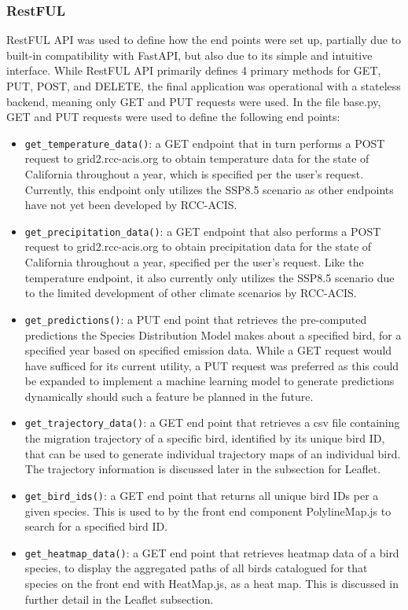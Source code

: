 \documentclass{article}
\begin{document}
\subsubsection*{RestFUL}
RestFUL API was used to define how the end points were set up, partially due to built-in compatibility with FastAPI, but also due to its simple and intuitive interface. While RestFUL API primarily defines 4 primary methods for GET, PUT, POST, and DELETE, the final application was operational with a stateless backend, meaning only GET and PUT requests were used.
In the file base.py, GET and PUT requests were used to define the following end points:

\begin{itemize}
	\item \texttt{get\_temperature\_data()}: a GET endpoint that in turn performs a POST request to grid2.rcc-acis.org to obtain temperature data for the state of California throughout a year, which is specified per the user's request. Currently, this endpoint only utilizes the SSP8.5 scenario as other endpoints have not yet been developed by RCC-ACIS.
   	 \item \texttt{get\_precipitation\_data()}: a GET endpoint that also performs a POST request to grid2.rcc-acis.org to obtain precipitation data for the state of California throughout a year, specified per the user's request. Like the temperature endpoint, it also currently only utilizes the SSP8.5 scenario due to the limited development of other climate scenarios by RCC-ACIS.
	\item \texttt{get\_predictions()}: a PUT end point that retrieves the pre-computed predictions the Species Distribution Model makes about a specified bird, for a specified year based on specified emission data. While a GET request would have sufficed for its current utility, a PUT request was preferred as this could be expanded to implement a machine learning model to generate predictions dynamically should such a feature be planned in the future.
	\item \texttt{get\_trajectory\_data()}: a GET end point that retrieves a csv file containing the migration trajectory of a specific bird, identified by its unique bird ID, that can be used to generate individual trajectory maps of an individual bird. The trajectory information is discussed later in the subsection for Leaflet.
	\item \texttt{get\_bird\_ids()}: a GET end point that returns all unique bird IDs per a given species. This is used to by the front end component PolylineMap.js to search for a specified bird ID.
	\item \texttt{get\_heatmap\_data()}: a GET end point that retrieves heatmap data of a bird species, to display the aggregated paths of all birds catalogued for that species on the front end with HeatMap.js, as a heat map. This is discussed in further detail in the Leaflet subsection.
\end{itemize}
\end{document}
